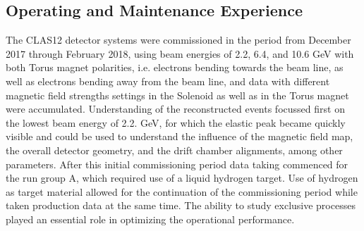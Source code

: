 \documentclass[final,3p,times,twocolumn,authoryear]{elsarticle}
\begin{document}
\subsection{\rm Operating and Maintenance Experience}
The CLAS12 detector systems were commissioned in the period from December 2017 through February 2018, using beam energies of 2.2, 6.4, and 10.6 GeV with both Torus magnet polarities, i.e. electrons bending towards the beam line, as well as electrons bending away from the beam line, and data with different magnetic field strengths settings in the Solenoid as well as in the Torus magnet were accumulated. Understanding of the reconstructed events focussed first on the lowest beam energy of 2.2. GeV, for
which the elastic peak became quickly visible and could be used to understand the influence of the magnetic field map, the 
overall detector geometry, and the drift chamber alignments, among other parameters. After this initial commissioning period data taking commenced for the run group A, which required use of a liquid hydrogen target. Use of hydrogen as target material allowed for the continuation of the commissioning period while taken production data at the same time. The ability to study exclusive processes played an essential role in optimizing the operational performance. 
\end{document}
